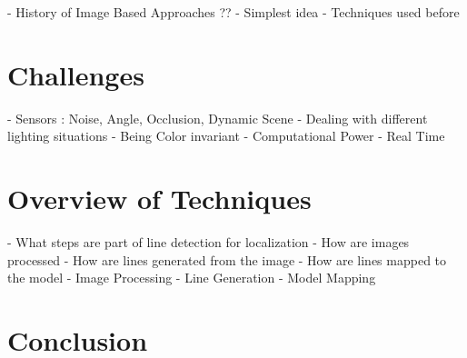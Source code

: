 \documentclass[12pt, a4paper]{scrartcl}
\begin{document}
  - History of Image Based Approaches ??
    - Simplest idea
    - Techniques used before

  \section{Challenges}
  - Sensors : Noise, Angle, Occlusion, Dynamic Scene
  - Dealing with different lighting situations
  - Being Color invariant
  - Computational Power
  - Real Time

  \section{Overview of Techniques}
  - What steps are part of line detection for localization
    - How are images processed
    - How are lines generated from the image
    - How are lines mapped to the model
  - Image Processing
  - Line Generation
  - Model Mapping

  \section{Conclusion}
\end{document}
